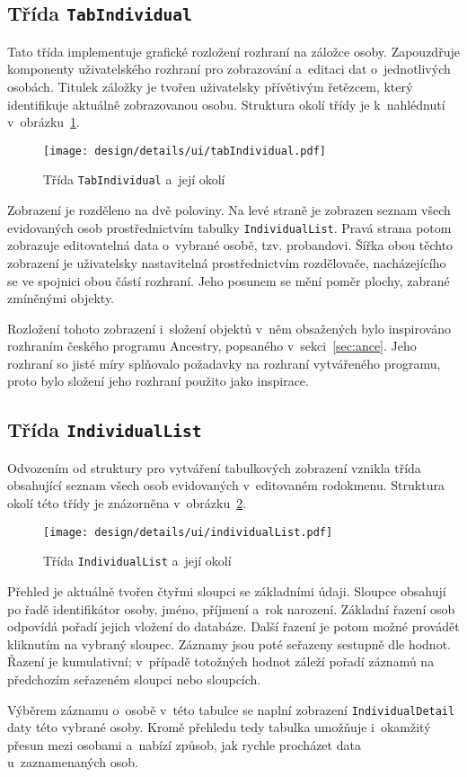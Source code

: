 		\subsection*{Třída \texttt{TabIndividual}}
		Tato třída implementuje grafické rozložení rozhraní na záložce osoby. Zapouzdřuje komponenty uživatelského rozhraní pro zobrazování a~editaci dat o~jednotlivých osobách. Titulek záložky je tvořen uživatelsky přívětivým řetězcem, který identifikuje aktuálně zobrazovanou osobu. Struktura okolí třídy je k~nahlédnutí v~obrázku~\ref{fig:designDetailTabIndividual}.\par
		\begin{figure}[h]
			\centering
			\texttt{[image: design/details/ui/tabIndividual.pdf]}
			\caption{Třída \texttt{TabIndividual} a~její okolí}
			\label{fig:designDetailTabIndividual}
		\end{figure}
		Zobrazení je rozděleno na dvě poloviny. Na levé straně je zobrazen seznam všech evidovaných osob prostřednictvím tabulky \texttt{IndividualList}. Pravá strana potom zobrazuje editovatelná data o~vybrané osobě, tzv. probandovi. Šířka obou těchto zobrazení je uživatelsky nastavitelná prostřednictvím rozdělovače, nacházejícího se ve spojnici obou částí rozhraní. Jeho posunem se mění poměr plochy, zabrané zmíněnými objekty.\par
		Rozložení tohoto zobrazení i~složení objektů v~něm obsažených bylo inspirováno rozhraním českého programu Ancestry, popsaného v~sekci~\ref{sec:ance}. Jeho rozhraní so jisté míry splňovalo požadavky na rozhraní vytvářeného programu, proto bylo složení jeho rozhraní použito jako inspirace.\par
		
		\subsection*{Třída \texttt{IndividualList}}
		Odvozením od struktury pro vytváření tabulkových zobrazení vznikla třída obsahující seznam všech osob evidovaných v~editovaném rodokmenu. Struktura okolí této třídy je znázorněna v~obrázku~\ref{fig:designDetailIndividualList}.\par
		\begin{figure}[h]
			\centering
			\texttt{[image: design/details/ui/individualList.pdf]}
			\caption{Třída \texttt{IndividualList} a~její okolí}
			\label{fig:designDetailIndividualList}
		\end{figure}
		Přehled je aktuálně tvořen čtyřmi sloupci se základními údaji. Sloupce obsahují po řadě identifikátor osoby, jméno, příjmení a~rok narození. Základní řazení osob odpovídá pořadí jejich vložení do databáze. Další řazení je potom možné provádět kliknutím na vybraný sloupec. Záznamy jsou poté seřazeny sestupně dle hodnot. Řazení je kumulativní; v~případě totožných hodnot záleží pořadí záznamů na předchozím seřazeném sloupci nebo sloupcích.\par
		Výběrem záznamu o~osobě v~této tabulce se naplní zobrazení \texttt{IndividualDetail} daty této vybrané osoby. Kromě přehledu tedy tabulka umožňuje i~okamžitý přesun mezi osobami a~nabízí způsob, jak rychle procházet data u~zaznamenaných osob. \par
		
